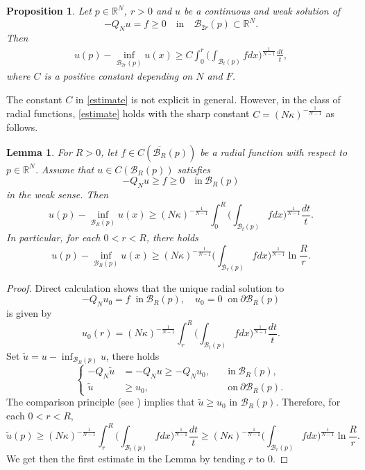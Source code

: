 \documentclass[11pt]{amsart}
\numberwithin{equation}{section}
\newtheorem{lem}[thm]{Lemma}
\newtheorem{prop}[thm]{Proposition}
\newcommand{\R}{\mathbb{R}}
\begin{document}
\begin{prop}\label{pro2.1}
Let $p \in \R^N$, $r > 0$ and $u$ be a continuous and weak solution of
$$-Q_{N}u=f\geq0 \quad\mbox{in}\quad \mathcal{B}_{2r}(p)\subset\mathbb{R}^{N}.$$
Then
\begin{align}\label{estimate}
u(p)-\inf_{\mathcal{B}_{2r}(p)}u(x)\geq C\int_{0}^{r}\Big(\int_{\mathcal{B}_{t}(p)}fdx\Big)^{\frac{1}{N-1}}\frac{dt}{t},
\end{align}
where $C$ is a positive constant depending on $N$ and $F$.
\end{prop}

The constant $C$ in \eqref{estimate} is not explicit in general. However, in the class of radial functions, \eqref{estimate} holds with the sharp constant $C=(N\kappa)^{-\frac{1}{N-1}}$ as follows.
\begin{lem}\label{lem2.2}
For $R>0$, let $f\in C(\overline{\mathcal{B}_R}(p))$ be a radial function with respect to $p\in\mathbb{R}^{N}$. Assume that $u\in C(\mathcal{B}_{R}(p))$ satisfies
$$-Q_{N}u\geq f \geq 0 \quad\mbox{in}~ \mathcal{B}_{R}(p)$$
in the weak sense. Then
$$u(p)-\inf_{\mathcal{B}_{R}(p)}u(x)\geq (N\kappa)^{-\frac{1}{N-1}}\int_{0}^{R}\Big(\int_{\mathcal{B}_{t}(p)}fdx\Big)^{\frac{1}{N-1}}\frac{dt}{t}.$$
In particular, for each $0<r<R$, there holds
$$u(p)-\inf_{\mathcal{B}_{R}(p)}u(x)\geq (N\kappa)^{-\frac{1}{N-1}}\Big(\int_{\mathcal{B}_{r}(p)}fdx\Big)^{\frac{1}{N-1}}\ln\frac{R}{r}.$$
\end{lem}

\begin{proof}
Direct calculation shows that the unique radial solution to
\begin{equation*}
-Q_{N}u_{0}=f \;\; \mbox{in} ~ \mathcal{B}_{R}(p),\quad u_{0}=0\;\; \mbox{on}~ \partial \mathcal{B}_{R}(p)
\end{equation*}
is given by
$$u_{0}(r)=(N\kappa)^{-\frac{1}{N-1}}\int_{r}^{R}\Big(\int_{\mathcal{B}_{t}(p)}fdx\Big)^{\frac{1}{N-1}}\frac{dt}{t}.$$
Set $\widetilde{u}=u-\inf_{\mathcal{B}_{R}(p)}u$, there holds
\[
\left\{
\begin{array}{rll}
-Q_{N}\widetilde{u}&\!=-Q_{N}u\geq-Q_{N}u_{0},  &\quad\mbox{in}~ \mathcal{B}_{R}(p),\\
\widetilde{u}&\!\geq u_{0}, &\quad\mbox{on}~ \partial \mathcal{B}_{R}(p).
\end{array}
\right.
\]
The comparison principle (see \cite[Theorem 4.2]{FK2009}) implies that $\widetilde{u}\geq u_{0}$ in $\mathcal{B}_{R}(p).$ Therefore, for each $0<r<R$,
$$\widetilde{u}(p)\geq (N\kappa)^{-\frac{1}{N-1}}\int_{r}^{R}\Big(\int_{\mathcal{B}_{t}(p)}fdx\Big)^{\frac{1}{N-1}}\frac{dt}{t}\geq (N\kappa)^{-\frac{1}{N-1}}\Big(\int_{\mathcal{B}_{r}(p)}fdx\Big)^{\frac{1}{N-1}}\ln\frac{R}{r}.$$
We get then the first estimate in the Lemma by tending $r$ to $0$.\end{proof}
\end{document}
